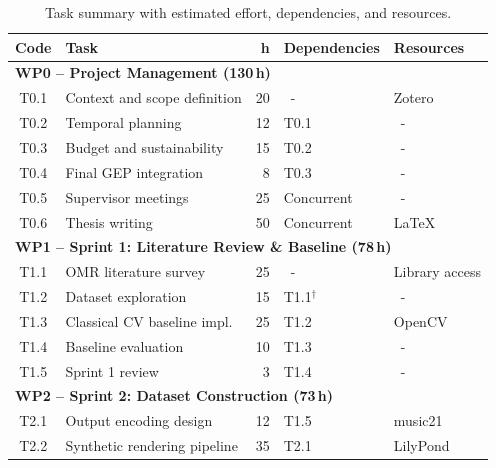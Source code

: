 \documentclass[11pt, a4paper]{article}
\begin{document}
\begin{table}[h!]
    \centering
    \caption{Task summary with estimated effort, dependencies, and resources.}
    \label{tab:task-summary}
    \renewcommand{\arraystretch}{1.05}
    \scriptsize
    \begin{tabularx}{\linewidth}{c >{\raggedright}p{4.2cm} r >{\raggedright\arraybackslash}p{2.2cm} >{\raggedright\arraybackslash}p{2.0cm}}
        \toprule
        \textbf{Code} & \textbf{Task} & \textbf{h} & \textbf{Dependencies} & \textbf{Resources} \\
        \midrule
        \multicolumn{5}{l}{\textbf{WP0 -- Project Management (130\,h)}} \\
        \midrule
        T0.1 & Context and scope definition         & 20  &~-~           & Zotero \\
        T0.2 & Temporal planning                    & 12  & T0.1           &~-~\\
        T0.3 & Budget and sustainability             & 15  & T0.2           &~-~\\
        T0.4 & Final GEP integration                & 8   & T0.3           &~-~\\
        T0.5 & Supervisor meetings                  & 25  & Concurrent     &~-~\\
        T0.6 & Thesis writing                       & 50  & Concurrent     & \LaTeX{} \\
        \midrule
        \multicolumn{5}{l}{\textbf{WP1 -- Sprint 1: Literature Review \& Baseline (78\,h)}} \\
        \midrule
        T1.1 & OMR literature survey                & 25  &~-~           & Library access \\
        T1.2 & Dataset exploration                  & 15  & T1.1$^\dagger$ &~-~\\
        T1.3 & Classical CV baseline impl.          & 25  & T1.2           & OpenCV \\
        T1.4 & Baseline evaluation                  & 10  & T1.3           &~-~\\
        T1.5 & Sprint 1 review                      & 3   & T1.4           &~-~\\
        \midrule
        \multicolumn{5}{l}{\textbf{WP2 -- Sprint 2: Dataset Construction (73\,h)}} \\
        \midrule
        T2.1 & Output encoding design               & 12  & T1.5           & music21 \\
        T2.2 & Synthetic rendering pipeline         & 35  & T2.1           & LilyPond \\

\end{tabularx}
\end{table}
\end{document}
